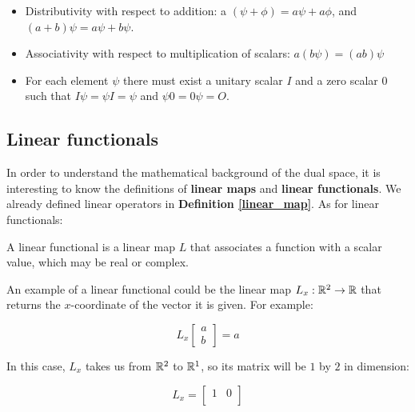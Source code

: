 \begin{definition}
\begin{itemize}
\begin{enumerate}
\begin{itemize}
                \item Distributivity with respect to addition: a $(\psi + \phi) = a \psi + a \phi$, and $(a + b)\psi = a\psi + b\psi$.
                \item Associativity with respect to multiplication of scalars: $a (b \psi) = (ab)\psi$
                \item For each element $\psi$ there must exist a unitary scalar $I$ and a zero scalar $0$ such that $I\psi = \psi I = \psi$ and $\psi 0 = 0\psi = O$.
            \end{itemize}
        \end{enumerate}
    \end{itemize}
\end{definition}

\subsection{Linear functionals} \label{linfunct}

In order to understand the mathematical background of the dual space, it is interesting to know the definitions of \textbf{linear maps} and \textbf{linear functionals}. We already defined linear operators in \textbf{Definition \ref{linear_map}}. As for linear functionals:

\begin{definition}
    A linear functional is a linear map $L$ that associates a function with a scalar value, which may be real or complex.
\end{definition}

An example of a linear functional could be the linear map $L_x : \mathbb{R}^2 \to \mathbb{R}$ that returns the $x$-coordinate of the vector it is given. For example:

\begin{equation}
    L_x\begin{bmatrix}
        a \\ b
    \end{bmatrix} = a
\end{equation}

In this case, $L_x$ takes us from $\mathbb{R}^2$ to $\mathbb{R}^1$, so its matrix will be $1$ by $2$ in dimension:

\begin{equation}
    L_x = \begin{bmatrix}
        1 & 0 \\
    \end{bmatrix}
\end{equation}

